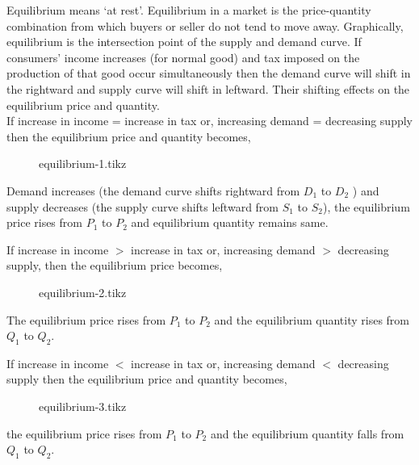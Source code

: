 \documentclass[12pt]{article}
\begin{document}
\begin{soln}
	Equilibrium means `at rest'. Equilibrium in a market is the price-quantity combination from which buyers or seller do not tend to move away. Graphically, equilibrium is the intersection point of the supply and demand curve. If consumers' income increases (for normal good) and tax imposed on the production of that good occur simultaneously then the demand curve will shift in the rightward and supply curve will shift in leftward. Their shifting effects on the equilibrium price and quantity.\\


	If increase in income = increase in tax or, increasing demand = decreasing supply then the equilibrium price and quantity becomes,
	\begin{figure}[H]
		\centering
		{equilibrium-1.tikz}
	\end{figure}
	Demand increases (the demand curve shifts rightward from $ D_1 $ to $ D_2 $ ) and supply decreases (the supply curve shifts leftward from $ S_1 $ to  $ S_2 $), the equilibrium price rises from $ P_1 $ to $ P_2 $ and equilibrium quantity remains same.\newpage


	If increase in income $ > $ increase in tax or, increasing demand $ > $ decreasing supply, then the equilibrium price becomes,
	\begin{figure}[H]
		\centering
		{equilibrium-2.tikz}
	\end{figure}
	The equilibrium price rises from $ P_1 $ to $ P_2 $ and the equilibrium quantity rises from $ Q_1 $ to $ Q_2 $.


	If increase in income $ < $ increase in tax or, increasing demand $ < $ decreasing supply then the equilibrium price and quantity becomes,
	\begin{figure}[H]
		\centering
		{equilibrium-3.tikz}
	\end{figure}
	the equilibrium price rises from $ P_1 $ to $ P_2 $ and the equilibrium quantity falls from $ Q_1 $ to $ Q_2 $.
\end{soln}
\newpage
\end{document}
